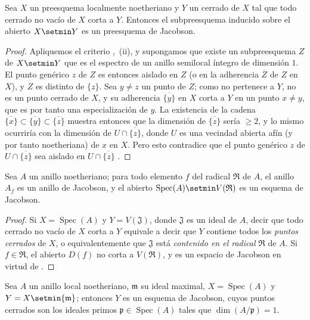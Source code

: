 \begin{proposition}[10.5.7]
\label{IV.10.5.7}
Sea $X$ un preesquema localmente noetheriano y $Y$ un cerrado de $X$ tal que todo cerrado no vacío de $X$ corta a $Y$.
Entonces el subpreesquema inducido sobre el abierto $X\setmin Y$ es un preesquema de Jacobson.
\end{proposition}

\begin{proof}
Apliquemos el criterio ,~(ii), y supongamos que existe un subpreesquema $Z$ de $X\setmin Y$ que es el espectro de un anillo semilocal íntegro de dimensión $1$. El punto genérico $z$ de $Z$ es entonces aislado en $Z$ (o en la adherencia $\overline Z$ de $Z$ en $X$), y $Z$ es distinto de $\{z\}$.
Sea $y\neq z$ un punto de $Z$; como no pertenece a $Y$, no es un punto cerrado de $X$, y su adherencia $\overline{\{y\}}$ en $X$ corta a $Y$ en un punto $x\neq y$, que es por tanto una especialización de $y$.
La existencia de la cadena $\overline{\{x\}}\subset\overline{\{y\}}\subset\overline{\{z\}}$ muestra entonces que la dimensión de $\overline{\{z\}}$ sería $\geq2$, y lo mismo ocurriría con la dimensión de $U\cap\overline{\{z\}}$, donde $U$ es una vecindad abierta afín (y por tanto noetheriana) de $x$ en $X$.
Pero esto contradice que el punto genérico $z$ de $U\cap\overline{\{z\}}$ sea aislado en $U\cap\overline{\{z\}}$ .
\end{proof}

\begin{corollary}[10.5.8]
\label{IV.10.5.8}
Sea $A$ un anillo noetheriano; para todo elemento $f$ del radical $\mathfrak R$ de $A$, el anillo $A_f$ es un anillo de Jacobson, y el abierto $\operatorname{Spec}(A)\setmin V(\mathfrak R)$ es un esquema de Jacobson.
\end{corollary}

\begin{proof}
Si $X=\operatorname{Spec}(A)$ y $Y=V(\mathfrak J)$, donde $\mathfrak J$ es un ideal de $A$, decir que todo cerrado no vacío de $X$ corta a $Y$ equivale  a decir que $Y$ contiene todos los \emph{puntos cerrados} de $X$, o equivalentemente que $\mathfrak J$ está \emph{contenido en el radical} $\mathfrak R$ de $A$.
Si $f\in\mathfrak R$, el abierto $D(f)$ no corta a $V(\mathfrak R)$, y es un espacio de Jacobson en virtud de .
\end{proof}

\begin{corollary}[10.5.9]
\label{IV.10.5.9}
Sea $A$ un anillo local noetheriano, $\mathfrak m$ su ideal maximal, $X=\operatorname{Spec}(A)$ y $Y=X\setmin\{\mathfrak m\}$; entonces $Y$ es un esquema de Jacobson, cuyos puntos cerrados son los ideales primos $\mathfrak p\in\operatorname{Spec}(A)$ tales que $\dim(A/\mathfrak p)=1$.
\end{corollary}

